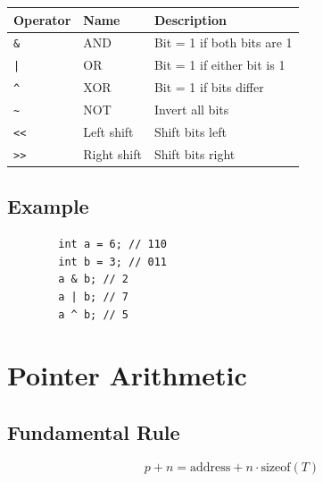 \documentclass[a4paper,9pt]{article}
\begin{document}
    \begin{tabular}{lll}
        \toprule
        Operator & Name & Description \\
        \midrule
        \texttt{\&} & AND & Bit = 1 if both bits are 1 \\
        \texttt{|} & OR & Bit = 1 if either bit is 1 \\
        \texttt{\^{}} & XOR & Bit = 1 if bits differ \\
        \texttt{\~{}} & NOT & Invert all bits \\
        \texttt{<<} & Left shift & Shift bits left \\
        \texttt{>>} & Right shift & Shift bits right \\
        \bottomrule
    \end{tabular}
    
    \subsection*{Example}
    \begin{lstlisting}
        int a = 6; // 110
        int b = 3; // 011
        a & b; // 2
        a | b; // 7
        a ^ b; // 5
    \end{lstlisting}
    
    \section{Pointer Arithmetic}
    
    \subsection*{Fundamental Rule}
    \[
    p + n = \text{address} + n \cdot \text{sizeof}(T)
    \]
    
\end{document}
